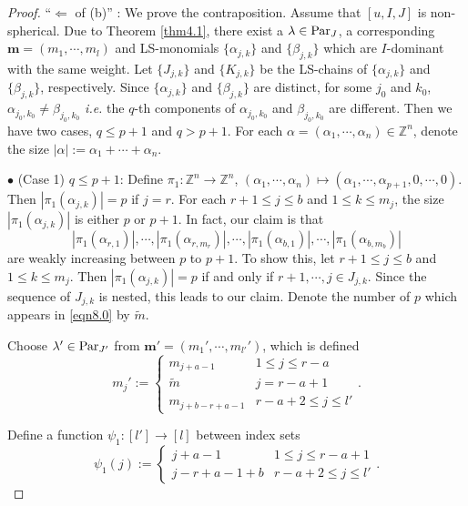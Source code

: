 \documentclass[12pt]{amsart}
\theoremstyle{definition}
\theoremstyle{remark}
\newcommand{\Z}{\mathbb{Z}}
\newcommand{\Parj}{{\rm Par}_J}
\begin{document}
\begin{proof}
``$\Leftarrow$ of (b)'' : We prove the contraposition. Assume that $[u,I,J]$ is non-spherical. Due to Theorem \ref{thm4.1}, there exist a $\lambda \in \Parj$, a corresponding $\mathbf{m} = (m_1 , \cdots , m_l)$ and LS-monomials $\{\alpha_{j,k} \}$ and $\{\beta_{j,k}\}$ which are $I$-dominant with the same weight. Let $\{J_{j,k}\}$ and $\{K_{j,k}\}$ be the LS-chains of $\{\alpha_{j,k}\}$ and $\{\beta_{j,k}\}$, respectively. Since $\{\alpha_{j,k} \}$ and $\{\beta_{j,k}\}$ are distinct, for some $j_0$ and $k_0$, $\alpha_{j_0,k_0} \neq \beta_{j_0,k_0}$ \textit{i.e.} the $q$-th components of $\alpha_{j_0,k_0}$ and $\beta_{j_0,k_0}$ are different. Then we have two cases, $q \leq p+1$ and $q > p+1$. For each $\alpha = (\alpha_1 , \cdots , \alpha_n) \in \Z^n$, denote the size $|\alpha| := \alpha_1 + \cdots + \alpha_n$.

$\bullet$ (Case 1) $q \leq p+1$: Define $\pi_1 : \Z^n \rightarrow \Z^n$, $(\alpha_1 , \cdots , \alpha_n ) \mapsto (\alpha_1 , \cdots , \alpha_{p+1} , 0 , \cdots , 0)$. Then $|\pi_1(\alpha_{j,k})| = p$ if $j=r$. For each $r+1 \leq j \leq b$ and $1 \leq k \leq m_j$, the size $|\pi_1(\alpha_{j,k})|$ is either $p$ or $p+1$. In fact, our claim is that
\begin{equation}\label{eqn8.0}
|\pi_1(\alpha_{r,1})|, \cdots , |\pi_1(\alpha_{r, m_{r}})| , \cdots , |\pi_1(\alpha_{b,1})|, \cdots , |\pi_1(\alpha_{b,m_b})|
\end{equation}
are weakly increasing between $p$ to $p+1$. To show this, let $r +1 \leq j \leq b$ and $1 \leq k \leq m_j$. Then $|\pi_1(\alpha_{j,k})| = p$ if and only if $r+1 , \cdots , j \in J_{j,k}$. Since the sequence of $J_{j,k}$ is nested, this leads to our claim. Denote the number of $p$ which appears in \eqref{eqn8.0} by $\tilde{m}$. 

Choose $\lambda' \in {\rm Par}_{J'}$ from $\mathbf{m'}=(m_1' , \cdots, m_{l'}')$, which is defined
\begin{equation}
m_{j}' :=
\begin{cases}
m_{j+a-1} & 1 \leq j \leq r-a \\
\tilde{m} & j=r-a+1\\
m_{j+b-r+a-1} & r-a+2 \leq j \leq l'
\end{cases}
.
\end{equation}

Define a function $\psi_1 : [l'] \rightarrow [l]$ between index sets
\begin{equation}
\psi_1 (j):=
\begin{cases}
j+a-1 & 1 \leq j \leq r-a+1 \\
j-r+a-1+b & r-a+2 \leq j \leq l'
\end{cases}
.
\end{equation}


\end{proof}
\end{document}
